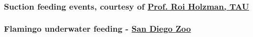 \begin{frame}[label=app-1]
    \frametitle{Suction feeding events, courtesy of \href{https://www.dropbox.com/s/wcytdkxuxxvn4q0/fish_feeding.mp4?raw=1}{Prof. Roi Holzman, TAU}}
\end{frame}
    
    \begin{frame}[label=app-2a]
    \frametitle{Flamingo underwater feeding - \href{https://www.dropbox.com/s/ic0l5npzon834l9/flamingo.mp4?raw=1}{San Diego Zoo}}
    \begin{center}
    \end{center}
    \end{frame}
    
    
